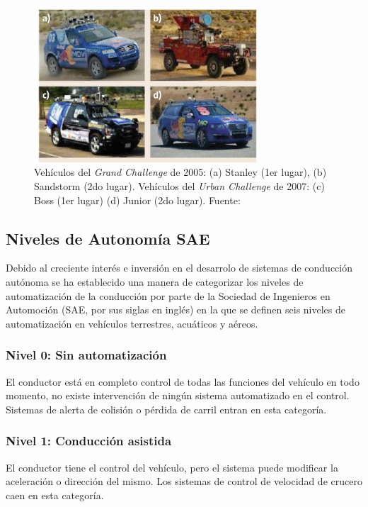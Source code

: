 \begin{figure}[!h] 
    \centering
    \includegraphics[width=0.75\textwidth]{img/darpa}
    \caption[Vehículos del \textit{Grand Challenge}]{Vehículos del \textit{Grand Challenge} de 2005: (a) Stanley (1er lugar), (b) Sandstorm (2do lugar). Vehículos del \textit{Urban Challenge} de 2007: (c) Boss (1er lugar) (d) Junior (2do lugar). Fuente: \cite{wikipedia_2018} }
    \label{fig:darpa}
\end{figure}



    \subsection{Niveles de Autonomía SAE}
    Debido al creciente interés e inversión en el desarrolo de sistemas de conducción autónoma se ha establecido 
    una manera de categorizar los niveles de automatización de la conducción por parte de  la Sociedad de Ingenieros en Automoción
    (SAE, por sus siglas en inglés) en la que se definen seis niveles de automatización en vehículos terrestres, acuáticos y aéreos.

        \subsubsection{Nivel 0: Sin automatización}
        El conductor está en completo control de todas las funciones del vehículo en todo momento, no existe intervención 
        de ningún sistema automatizado en el control. Sistemas de alerta de colisión o pérdida de carril entran en esta categoría.
        
        \subsubsection{Nivel 1: Conducción asistida}
        El conductor tiene el control del vehículo, pero el sistema puede modificar la aceleración o dirección del mismo. Los 
        sistemas de control de velocidad de crucero caen en esta categoría.
        
